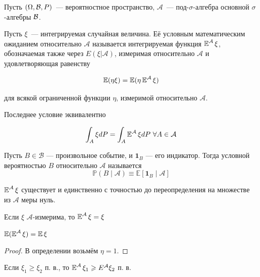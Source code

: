 Пусть $(\Omega, \mathcal{B}, P)$~--- вероятностное пространство, $\mathcal{A}$~--- под-$\sigma$-алгебра основной $\sigma$-алгебры $\mathcal{B}$.

\begin{definition}
    Пусть $\xi$~--- интегрируемая случайная величина. Её условным математическим ожиданием относительно $\mathcal{A}$ называется интегрируемая функция $\operatorname{\mathbb{E}}^{\mathcal{A}} \xi$, обозначаемая также через $E(\xi|\mathcal{A})$, измеримая относительно $\mathcal{A}$ и удовлетворяющая равенству

    \[
    \operatorname{\mathbb{E}}(\eta \xi)  = \operatorname{\mathbb{E}}(\eta \operatorname{\mathbb{E}}^{\mathcal{A}} \xi)
    \]

    для всякой ограниченной функции $\eta$, измеримой относительно $\mathcal{A}$.

    Последнее условие эквивалентно

    \[
    \int_A \xi dP = \int_A \operatorname{\mathbb{E}}^{\mathcal{A}} \xi dP \ \forall A \in \mathcal{A}
    \]
\end{definition}

\begin{definition}
    Пусть $B \in {\mathcal{B}}$ — произвольное событие, и $\mathbf{1}_{B}$ — его индикатор. Тогда условной вероятностью $B$ относительно ${\mathcal{A}}$ называется $$\mathbb{P}(B \mid {\mathcal{A}}) \equiv \mathbb{E} [\mathbf {1}_{B} \mid {\mathcal{A}}]$$
\end{definition}

\begin{statement}
    $\operatorname{\mathbb{E}}^{\mathcal{A}} \xi$ существует и единственно с точностью до переопределения на множестве из $\mathcal{A}$ меры нуль.
\end{statement}

\begin{statement}
    Если $\xi$ $\mathcal{A}$-измерима, то $\operatorname{\mathbb{E}}^{\mathcal{A}} \xi = \xi$
\end{statement}

\begin{statement}
    $\operatorname{\mathbb{E}}(\operatorname{\mathbb{E}}^{\mathcal{A}} \xi) = \operatorname{\mathbb{E}} \xi$
\end{statement}

\begin{proof}
    В определении возьмём $\eta = 1$.
\end{proof}

\begin{statement}
    Если $\xi_1 \geq \xi_2$ п. в., то 
    $\operatorname{\mathbb{E}}^{\mathcal{A}} \xi_1 \geqslant E^{\mathcal{A}} \xi_2$ п. в.
\end{statement}

